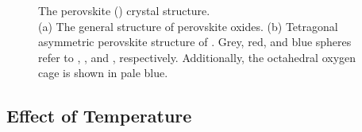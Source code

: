 \begin{figure}[htbp]
   \centering
   \hspace{0.5cm}	
   \caption[Crystal Structures of Perovskites and ]%
   		{The perovskite () crystal structure.\\(a) The general structure of perovskite oxides. %
		(b) Tetragonal asymmetric perovskite structure of \PTO{}. Grey, red, and blue spheres refer %
		to \PbIon{}, \TiIon{}, and \OIon{}, respectively. Additionally, the octahedral oxygen cage is %
		shown in pale blue. %
		}
   \label{fig:Crystals}
\end{figure}


\subsection{Effect of Temperature}

